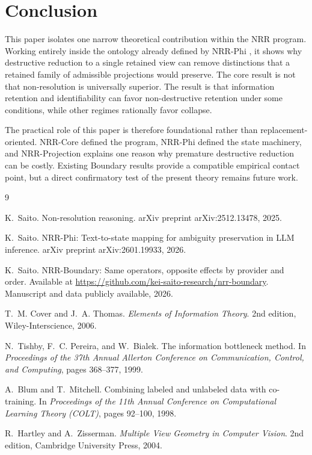 \documentclass[11pt,a4paper]{article}
\begin{document}
\section{Conclusion}
\label{sec:conclusion}

This paper isolates one narrow theoretical contribution within the NRR program. Working entirely inside the ontology already defined by NRR-Phi \cite{saito2026phi}, it shows why destructive reduction to a single retained view can remove distinctions that a retained family of admissible projections would preserve. The core result is not that non-resolution is universally superior. The result is that information retention and identifiability can favor non-destructive retention under some conditions, while other regimes rationally favor collapse.

The practical role of this paper is therefore foundational rather than replacement-oriented. NRR-Core \cite{saito2025nrr} defined the program, NRR-Phi \cite{saito2026phi} defined the state machinery, and NRR-Projection explains one reason why premature destructive reduction can be costly. Existing Boundary results \cite{saito2026boundary} provide a compatible empirical contact point, but a direct confirmatory test of the present theory remains future work.

\begin{thebibliography}{9}

K.~Saito.
\newblock Non-resolution reasoning.
\newblock arXiv preprint arXiv:2512.13478, 2025.

K.~Saito.
\newblock NRR-Phi: Text-to-state mapping for ambiguity preservation in LLM inference.
\newblock arXiv preprint arXiv:2601.19933, 2026.

K.~Saito.
\newblock NRR-Boundary: Same operators, opposite effects by provider and order.
\newblock Available at \url{https://github.com/kei-saito-research/nrr-boundary}. Manuscript and data publicly available, 2026.

T.~M. Cover and J.~A. Thomas.
\newblock \emph{Elements of Information Theory}.
\newblock 2nd edition, Wiley-Interscience, 2006.

N.~Tishby, F.~C. Pereira, and W.~Bialek.
\newblock The information bottleneck method.
\newblock In \emph{Proceedings of the 37th Annual Allerton Conference on Communication, Control, and Computing}, pages 368--377, 1999.

A.~Blum and T.~Mitchell.
\newblock Combining labeled and unlabeled data with co-training.
\newblock In \emph{Proceedings of the 11th Annual Conference on Computational Learning Theory (COLT)}, pages 92--100, 1998.

R.~Hartley and A.~Zisserman.
\newblock \emph{Multiple View Geometry in Computer Vision}.
\newblock 2nd edition, Cambridge University Press, 2004.

\end{thebibliography}
\end{document}
